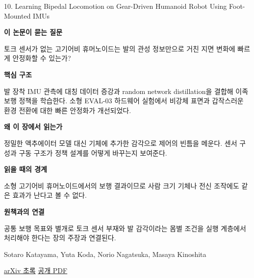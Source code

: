 \documentclass[11pt,openany]{book}
\begin{document}
\begin{termcard}{10. Learning Bipedal Locomotion on Gear-Driven Humanoid Robot Using Foot-Mounted IMUs}

\par

\medskip

{\sffamily\bfseries\color{deepblue} 이 논문이 묻는 질문}\par

토크 센서가 없는 고기어비 휴머노이드는 발의 관성 정보만으로 거친 지면 변화에 빠르게 안정화할 수 있는가?

\smallskip

{\sffamily\bfseries\color{deepblue} 핵심 구조}\par

발 장착 IMU 관측에 대칭 데이터 증강과 random network distillation을 결합해 이족 보행 정책을 학습한다. 소형 EVAL-03 하드웨어 실험에서 비강체 표면과 갑작스러운 환경 전환에 대한 빠른 안정화가 개선되었다.

\smallskip

{\sffamily\bfseries\color{deepblue} 왜 이 장에서 읽는가}\par

정밀한 액추에이터 모델 대신 기체에 추가한 감각으로 제어의 빈틈을 메운다. 센서 구성과 구동 구조가 정책 설계를 어떻게 바꾸는지 보여준다.

\smallskip

{\sffamily\bfseries\color{coral} 읽을 때의 경계}\par

소형 고기어비 휴머노이드에서의 보행 결과이므로 사람 크기 기체나 전신 조작에도 같은 효과가 난다고 볼 수 없다.

\smallskip

{\sffamily\bfseries\color{teal} 원책과의 연결}\par

공통 보행 목표와 별개로 토크 센서 부재와 발 감각이라는 몸별 조건을 실행 계층에서 처리해야 한다는 장의 주장과 연결된다.

\medskip

{\footnotesize\color{muted} Sotaro Katayama, Yuta Koda, Norio Nagatsuka, Masaya Kinoshita\par

\href{https://arxiv.org/abs/2504.00614}{arXiv 초록} \quad \href{https://arxiv.org/pdf/2504.00614}{공개 PDF}\par}

\end{termcard}
\end{document}
